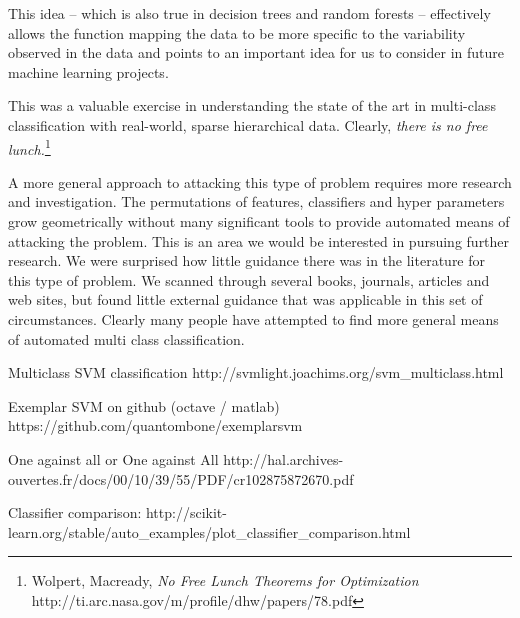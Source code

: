 \documentclass[11pt, oneside]{article}   	%
\begin{document}
This idea -- which is also true in decision trees and random forests -- effectively allows the function mapping the data to be more specific to the variability observed in the data and points to an important idea for us to consider in future machine learning projects.

This was a valuable exercise in understanding the state of the art in multi-class classification with real-world, sparse hierarchical data. Clearly, \emph{there is no free lunch.}\footnote{Wolpert, Macready, \emph{No Free Lunch Theorems for Optimization} http://ti.arc.nasa.gov/m/profile/dhw/papers/78.pdf}

A more general approach to attacking this type of problem requires more research and investigation. The permutations of features, classifiers and hyper parameters grow geometrically without many significant tools to provide automated means of attacking the problem. This is an area we would be interested in pursuing further research.
\clearpage
We were surprised how little guidance there was in the literature for this type of problem. We scanned through several books, journals, articles and web sites, but found little external guidance that was applicable in this set of circumstances. Clearly many people have attempted to find more general means of automated multi class classification.


\renewcommand{\refname}{Background Reading}

\begin{thebibliography}{1}

  Multiclass SVM classification http://svmlight.joachims.org/svm\_multiclass.html

  Exemplar SVM on github (octave / matlab)
  https://github.com/quantombone/exemplarsvm

  One against all or One against All
  http://hal.archives-ouvertes.fr/docs/00/10/39/55/PDF/cr102875872670.pdf

  Classifier comparison:
  http://scikit-learn.org/stable/auto\_examples/plot\_classifier\_comparison.html

  \end{thebibliography}
\end{document}
